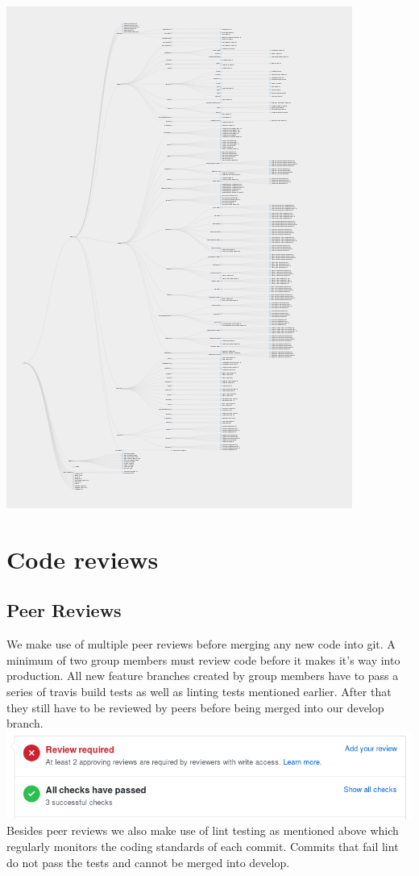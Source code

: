 \documentclass[a4paper]{article}
\begin{document}
\includegraphics[scale=1]{system.png}\\

\section { Code reviews }
\subsection { Peer Reviews }
We make use of multiple peer reviews before merging any new code into git. A minimum of two group members 
must review code before it makes it's way into production. All new feature branches created by group members 
have to pass a series of travis build tests as well as linting tests mentioned earlier. After that they still 
have to be reviewed by peers before being merged into our develop branch. \\
\includegraphics[scale=0.6]{reviews.png}\\
Besides peer reviews we also make use of lint testing as mentioned above which regularly monitors the coding 
standards of each commit. Commits that fail lint do not pass the tests and cannot be merged into develop.
\end{document}
